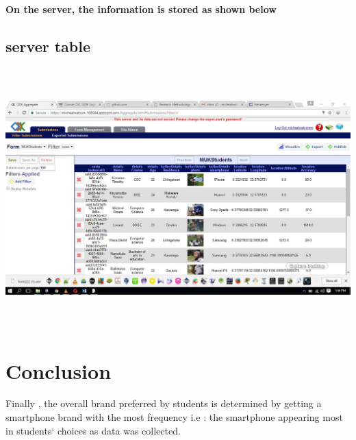 \documentclass{article}
\begin{document}
\textbf{On the server, the information is stored as shown below}

\subsection{server table}
\graphicspath{{ODKprojectReport/}}
\includegraphics[width = 16cm , height = 10cm ]{Screenshot1}




\section{Conclusion}
Finally , the overall brand preferred by students is determined by getting a smartphone brand with the most frequency i.e : the smartphone appearing most in students` choices as data was collected.
\end{document}
